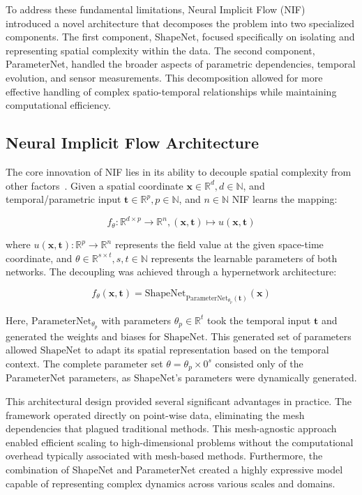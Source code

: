 \documentclass[10pt,journal,compsoc,onecolumn]{IEEEtran}
\begin{document}
To address these fundamental limitations, Neural Implicit Flow (NIF)~\cite{nif2023} introduced a novel architecture that decomposes the problem into two specialized components. The first component, ShapeNet, focused specifically on isolating and representing spatial complexity within the data. The second component, ParameterNet, handled the broader aspects of parametric dependencies, temporal evolution, and sensor measurements. This decomposition allowed for more effective handling of complex spatio-temporal relationships while maintaining computational efficiency.

\subsection{Neural Implicit Flow Architecture}
The core innovation of NIF lies in its ability to decouple spatial complexity from other factors~\cite{nif2023}. Given a spatial coordinate $\mathbf{x} \in \mathbb{R}^d, d \in \mathbb{N}$, and temporal/parametric input $\mathbf{t} \in \mathbb{R}^p, p \in \mathbb{N}$, and $n \in \mathbb{N}$ NIF learns the mapping:

\begin{equation}
    f_\theta: \mathbb{R}^{d \times p} \to \mathbb{R}^n, (\mathbf{x}, \mathbf{t}) \mapsto u(\mathbf{x}, \mathbf{t})
\end{equation}

where $u(\mathbf{x}, \mathbf{t}): \mathbb{R}^{p} \to \mathbb{R}^n$ represents the field value at the given space-time coordinate, and $\theta \in \mathbb{R}^{s \times t}, s, t \in \mathbb{N}$ represents the learnable parameters of both networks. The decoupling was achieved through a hypernetwork architecture:

\begin{equation}
    f_\theta(\mathbf{x}, \mathbf{t}) = \text{ShapeNet}_{\text{ParameterNet}_{\theta_p}(\mathbf{t})}(\mathbf{x})
\end{equation}

Here, $\text{ParameterNet}_{\theta_p}$ with parameters $\theta_p \in \mathbb{R}^{t}$ took the temporal input $\mathbf{t}$ and generated the weights and biases for $\text{ShapeNet}$. This generated set of parameters allowed $\text{ShapeNet}$ to adapt its spatial representation based on the temporal context. The complete parameter set $\theta = \theta_p \times 0^s$ consisted only of the ParameterNet parameters, as ShapeNet's parameters were dynamically generated.

This architectural design provided several significant advantages in practice. The framework operated directly on point-wise data, eliminating the mesh dependencies that plagued traditional methods. This mesh-agnostic approach enabled efficient scaling to high-dimensional problems without the computational overhead typically associated with mesh-based methods. Furthermore, the combination of ShapeNet and ParameterNet created a highly expressive model capable of representing complex dynamics across various scales and domains.
\end{document}
